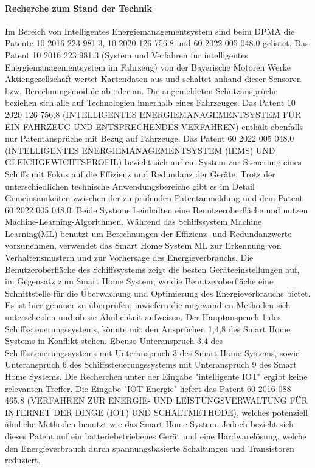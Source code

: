 \paragraph{Recherche zum Stand der Technik}
Im Bereich von Intelligentes Energiemanagementsystem sind beim DPMA die Patente
10 2016 223 981.3, 10 2020 126 756.8 und 60 2022 005 048.0 gelistet. Das Patent
10 2016 223 981.3 (System und Verfahren für intelligentes Energiemanagementsystem im Fahrzeug)
von der Bayerische Motoren Werke Aktiengesellschaft wertet Kartendaten aus 
und schaltet anhand dieser Sensoren bzw. Berechnungsmodule ab oder an.
Die angemeldeten Schutzansprüche \cite{DPMAregisterRecherchierbarerText} beziehen
sich alle auf Technologien innerhalb eines Fahrzeuges.
Das Patent 10 2020 126 756.8 (INTELLIGENTES ENERGIEMANAGEMENTSYSTEM FÜR EIN FAHRZEUG UND ENTSPRECHENDES VERFAHREN)
\cite{DPMAregisterRecherchierbarerTexta} enthält ebenfalls nur
Patentansprüche mit Bezug auf Fahrzeuge.
Das Patent 60 2022 005 048.0 (INTELLIGENTES ENERGIEMANAGEMENTSYSTEM (IEMS) UND GLEICHGEWICHTSPROFIL)
\cite{DPMAregisterRecherchierbarerTextb} bezieht sich auf ein System zur Steuerung eines Schiffs
mit Fokus auf die Effizienz und Redundanz der Geräte. 
Trotz der unterschiedlichen technische Anwendungsbereiche gibt 
es im Detail Gemeinsamkeiten zwischen der zu prüfenden Patentanmeldung 
und dem Patent 60 2022 005 048.0. 
Beide Systeme beinhalten eine Benutzeroberfläche und
nutzen Machine-Learning-Algorithmen. 
Während das Schiffssystem Machine Learning(ML) benutzt um Berechnungen 
der Effizienz- und Redundanzwerte vorzunehmen, verwendet das Smart Home
System ML zur Erkennung von Verhaltensmustern 
und zur Vorhersage des Energieverbrauchs. Die Benutzeroberfläche
des Schiffssystems zeigt die besten Geräteeinstellungen auf,
im Gegensatz zum Smart Home System, wo die 
Benutzeroberfläche eine Schnittstelle für die
Überwachung und Optimierung des Energieverbrauchs bietet.
Es ist hier genauer zu überprüfen, inwiefern die 
angewandten Methoden sich unterscheiden und ob sie Ähnlichkeit aufweisen.
Der Hauptanspruch 1 des Schiffssteuerungssystems, könnte
mit den Ansprüchen 1,4,8 des Smart Home Systems in Konflikt stehen.
Ebenso Unteranspruch 3,4 des Schiffssteuerungssystems mit Unteranspruch 3 des Smart Home Systems,
sowie Unteranspruch 6 des Schiffssteuerungssystems mit Unteranspruch 9 des Smart Home Systems.
Die Recherchen unter der Eingabe "intelligente IOT" ergibt keine relevanten Treffer.
Die Eingabe "IOT Energie" liefert das Patent 60 2016 088 465.8 
(VERFAHREN ZUR ENERGIE- UND LEISTUNGSVERWALTUNG FÜR INTERNET DER DINGE (IOT) UND SCHALTMETHODE),
welches potenziell ähnliche Methoden benutzt wie das Smart Home System.
Jedoch bezieht sich dieses Patent auf ein batteriebetriebenes Gerät
und eine Hardwarelösung,
welche den Energieverbrauch durch spannungsbasierte Schaltungen und Transistoren reduziert.

